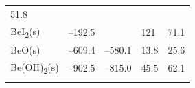 \documentclass[
  9pt,
]{extbook}
\theoremstyle{definition}
\theoremstyle{definition}
\theoremstyle{definition}
\theoremstyle{remark}
\begin{document}
\begin{longtable}[]{@{}lllll@{}}
\begin{minipage}[t]{0.18\columnwidth}
51.8\strut
\end{minipage}\tabularnewline
\begin{minipage}[t]{0.10\columnwidth}\raggedright
BeI\textsubscript{2}(s)\strut
\end{minipage} & \begin{minipage}[t]{0.19\columnwidth}\raggedright
--192.5\strut
\end{minipage} & \begin{minipage}[t]{0.20\columnwidth}\raggedright
\strut
\end{minipage} & \begin{minipage}[t]{0.18\columnwidth}\raggedright
121\strut
\end{minipage} & \begin{minipage}[t]{0.18\columnwidth}\raggedright
71.1\strut
\end{minipage}\tabularnewline
\begin{minipage}[t]{0.10\columnwidth}\raggedright
BeO(s)\strut
\end{minipage} & \begin{minipage}[t]{0.19\columnwidth}\raggedright
--609.4\strut
\end{minipage} & \begin{minipage}[t]{0.20\columnwidth}\raggedright
--580.1\strut
\end{minipage} & \begin{minipage}[t]{0.18\columnwidth}\raggedright
13.8\strut
\end{minipage} & \begin{minipage}[t]{0.18\columnwidth}\raggedright
25.6\strut
\end{minipage}\tabularnewline
\begin{minipage}[t]{0.10\columnwidth}\raggedright
Be(OH)\textsubscript{2}(s)\strut
\end{minipage} & \begin{minipage}[t]{0.19\columnwidth}\raggedright
--902.5\strut
\end{minipage} & \begin{minipage}[t]{0.20\columnwidth}\raggedright
--815.0\strut
\end{minipage} & \begin{minipage}[t]{0.18\columnwidth}\raggedright
45.5\strut
\end{minipage} & \begin{minipage}[t]{0.18\columnwidth}\raggedright
62.1\strut
\end{minipage}\tabularnewline
\begin{minipage}[t]{0.10\columnwidth}\raggedright

\end{minipage}
\end{longtable}
\end{document}
